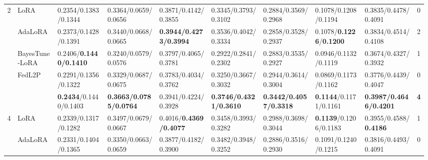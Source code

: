 \begin{table*}[t]
\begin{scriptsize}
{\begin{tabular}{c|l|l|l|l|l|l|l|l|c}
\multirow{5}{*}{2}  & LoRA                                   & 0.2354/0.1383/0.1344             & 0.3364/0.0659/0.0656             & 0.3871/0.4142/0.3855             & 0.3345/0.3793/0.3102             & 0.2884/0.3569/0.2968             & 0.1078/0.1208/0.1194             & 0.3835/0.4478/0.4091                                         & 0             \\ %
                    & AdaLoRA                              & 0.2373/0.1428/0.1391             & 0.3440/0.0668/0.0665              & \textbf{0.3944/0.4273/0.3994}    & 0.3536/0.4042/0.3334             & 0.2858/0.3528/0.2937             & 0.1078/\textbf{0.1226}/\textbf{0.1200}               & 0.3834/0.4514/0.4108                                         & 2             \\ %
                    & BayesTune-LoRA                            & 0.2406/\textbf{0.1440/0.1410}               & 0.3240/0.0579/0.0576              & 0.3797/0.4065/0.3781             & 0.2922/0.2841/0.2302             & 0.2883/0.3535/0.2927             & 0.0946/0.1132/0.1119             & 0.3674/0.4327/0.3932                                         & 1             \\ %
                    & FedL2P                               & 0.2291/0.1356/0.1322             & 0.3329/0.0687/0.0675             & 0.3783/0.4034/0.3762             & 0.3250/0.3667/0.3032              & 0.2944/0.3614/0.3004             & 0.0869/0.1173/0.1162             & 0.3776/0.4439/0.4047                                         & 0             \\ %
                    & \method{}                                 & \textbf{0.2434}/0.1440/0.1403     & \textbf{0.3663/0.0785/0.0764}    & 0.3941/0.4224/0.3928             & \textbf{0.3746/0.4321/0.3610}     & \textbf{0.3442/0.4057/0.3318}    & \textbf{0.1144}/0.1171/0.1161    & \textbf{0.3987/0.4646/0.4201}                                & \textbf{4}    \\ \hline
\multirow{5}{*}{4}  & LoRA                                   & 0.2339/0.1317/0.1282             & 0.3497/0.0679/0.0667             & 0.4016/\textbf{0.4369/0.4077}             & 0.3458/0.3993/0.3282             & 0.2988/0.3698/0.3044             & \textbf{0.1139}/0.1206/0.1183    & 0.3955/0.4588/\textbf{0.4186}                                         & 1             \\ %
                    & AdaLoRA                              & 0.2331/0.1404/0.1365             & 0.3350/0.0663/0.0659              & 0.3877/0.4182/0.3900               & 0.3482/0.3948/0.3252             & 0.2886/0.3516/0.2930              & 0.1091/0.1240/0.1215              & 0.3816/0.4493/0.4091                                         & 0             \\ %

\end{tabular}}
\end{scriptsize}
\end{table*}
